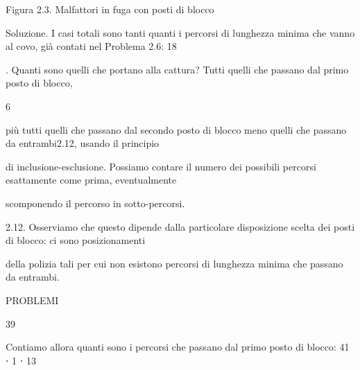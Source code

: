 \documentclass[a4paper,portrait,12pt]{article}
\begin{document}
\begin{flushleft}
Figura 2.3. Malfattori in fuga con posti di blocco
\end{flushleft}


\begin{flushleft}
Soluzione. I casi totali sono tanti quanti i percorsi di lunghezza minima che vanno al covo, gi\`{a} contati nel Problema 2.6: 18
\end{flushleft}


\begin{flushleft}
. Quanti sono quelli che portano alla cattura? Tutti quelli che passano dal primo posto di blocco,
\end{flushleft}


6


\begin{flushleft}
più tutti quelli che passano dal secondo posto di blocco meno quelli che passano da entrambi2.12, usando il principio
\end{flushleft}


\begin{flushleft}
di inclusione-esclusione. Possiamo contare il numero dei possibili percorsi esattamente come prima, eventualmente
\end{flushleft}


\begin{flushleft}
scomponendo il percorso in sotto-percorsi.
\end{flushleft}


\begin{flushleft}
2.12. Osserviamo che questo dipende dalla particolare disposizione scelta dei posti di blocco: ci sono posizionamenti
\end{flushleft}


\begin{flushleft}
della polizia tali per cui non esistono percorsi di lunghezza minima che passano da entrambi.
\end{flushleft}





\begin{flushleft}
 PROBLEMI
\end{flushleft}





39





\begin{flushleft}
Contiamo allora quanti sono i percorsi che passano dal primo posto di blocco: 41 ⋅ 1 ⋅ 13
\end{flushleft}
\end{document}
